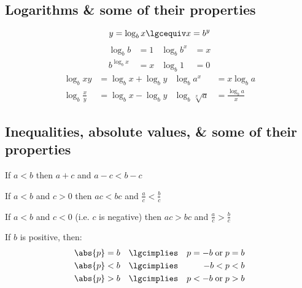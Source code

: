 \documentclass[main.tex]{subfiles}
\begin{document}
\begin{multicols}{2}
		\subsection*{Logarithms \& some of their properties}
		\[y = \log_{b}x \lgcequiv x = b^{y}\]
		\begin{align*}
			\log_{b}{b} &= 1 & \log_{b}{b^x} &= x \\
			b^{\log_{b}{x}} &= x & \log_{b}{1} &= 0
		\end{align*}
		\begin{align*}
			\log_{b}{xy} &= \log_{b}{x} + \log_{b}{y} & \log_{b}{a^x} &= x \log_{b}{a} \\
			\log_{b}{\frac{x}{y}} &= \log_{b}{x} - \log_{b}{y} & \log_{b}{\sqrt[x]{a}} &= \frac{\log_{b}{a}}{x}
		\end{align*}

		\subsection*{Inequalities, absolute values, \& some of their properties}
		If \(a < b\) then \(a + c\) and \(a - c < b - c\)

		If \(a < b\) and \(c > 0\) then \(ac < bc\) and \(\frac{a}{c} < \frac{b}{c}\)

		If \(a < b\) and \(c < 0\) (i.e. \(c\) is negative) then \(ac > bc\) and \(\frac{a}{c} > \frac{b}{c}\)

		If \(b\) is positive, then:
		\begin{align*}  %
			\abs{p} &= b &\lgcimplies && p = -b \; \text{or} \; p = b \\
			\abs{p} &< b &\lgcimplies && -b < p < b \\
			\abs{p} &> b &\lgcimplies && p < -b \; \text{or} \; p > b
		\end{align*}
	\end{multicols}
\end{document}
